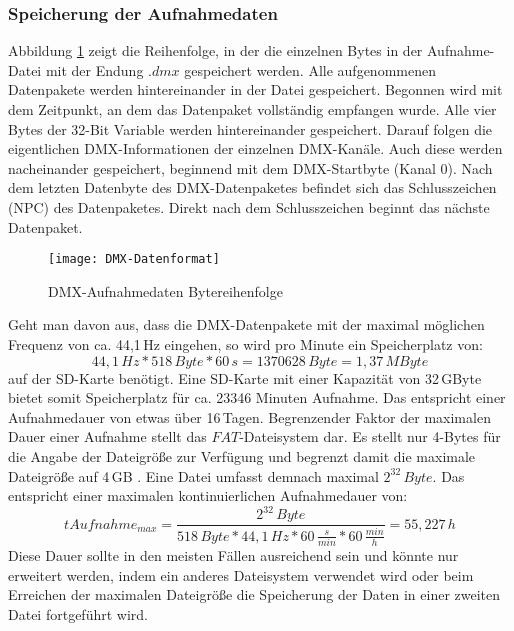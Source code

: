 \subsubsection{Speicherung der Aufnahmedaten}
\label{sec:save_data}
Abbildung \ref{fig:DMXDatenformat} zeigt die Reihenfolge, in der die einzelnen Bytes in der Aufnahme-Datei mit der Endung $.dmx$ gespeichert werden. Alle aufgenommenen Datenpakete werden hintereinander in der Datei gespeichert. Begonnen wird mit dem Zeitpunkt, an dem das Datenpaket vollständig empfangen wurde. Alle vier Bytes der 32-Bit Variable werden hintereinander gespeichert. Darauf folgen die eigentlichen DMX-Informationen der einzelnen DMX-Kanäle. Auch diese werden nacheinander gespeichert, beginnend mit dem DMX-Startbyte (Kanal 0). Nach dem letzten Datenbyte des DMX-Datenpaketes befindet sich das Schlusszeichen (NPC) des Datenpaketes. Direkt nach dem Schlusszeichen beginnt das nächste Datenpaket. 
\begin{figure}[h]
	\begin{center}
		\texttt{[image: DMX-Datenformat]}
		\caption{DMX-Aufnahmedaten Bytereihenfolge}
		\label{fig:DMXDatenformat}
	\end{center}
\end{figure} Geht man davon aus, dass die DMX-Datenpakete mit der maximal möglichen Frequenz von ca. 44,1\,Hz eingehen, so wird pro Minute ein Speicherplatz von:
\begin{equation}
	44,1\,Hz * 518\,Byte * 60\,s = 1370628\,Byte = 1,37\,MByte
\end{equation} auf der SD-Karte benötigt. Eine SD-Karte mit einer Kapazität von 32\,GByte bietet somit Speicherplatz für ca. 23346 Minuten Aufnahme. Das entspricht einer Aufnahmedauer von etwas über 16\,Tagen. Begrenzender Faktor der maximalen Dauer einer Aufnahme stellt das $FAT$-Dateisystem dar. Es stellt nur 4-Bytes für die Angabe der Dateigröße zur Verfügung und begrenzt damit die maximale Dateigröße auf 4\,GB \cite[s. 128]{BetriebssystemeKompakt}. Eine Datei umfasst demnach maximal $2^{32}\,Byte$. Das entspricht einer maximalen kontinuierlichen Aufnahmedauer von:
\begin{equation}
	tAufnahme_{max} = \frac{2^{32}\,Byte}{518\,Byte * 44,1\,Hz * 60\,\frac{s}{min} * 60\,\frac{min}{h}} = 55,227\,h
\end{equation}
Diese Dauer sollte in den meisten Fällen ausreichend sein und könnte nur erweitert werden, indem ein anderes Dateisystem verwendet wird oder beim Erreichen der maximalen Dateigröße die Speicherung der Daten in einer zweiten Datei fortgeführt wird. 
